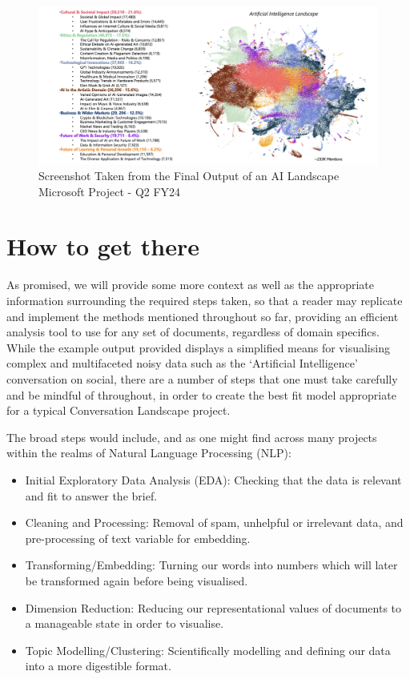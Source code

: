 \documentclass[
  letterpaper,
  DIV=11,
  numbers=noendperiod]{scrreprt}
\begin{document}
\begin{figure}[H]

{\centering \includegraphics{img/ai_landscape_output_example.png}

}

\caption{Screenshot Taken from the Final Output of an AI Landscape
Microsoft Project - Q2 FY24}

\end{figure}%

\section{How to get there}\label{how-to-get-there}

As promised, we will provide some more context as well as the
appropriate information surrounding the required steps taken, so that a
reader may replicate and implement the methods mentioned throughout so
far, providing an efficient analysis tool to use for any set of
documents, regardless of domain specifics. While the example output
provided displays a simplified means for visualising complex and
multifaceted noisy data such as the `Artificial Intelligence'
conversation on social, there are a number of steps that one must take
carefully and be mindful of throughout, in order to create the best fit
model appropriate for a typical Conversation Landscape project.

The broad steps would include, and as one might find across many
projects within the realms of Natural Language Processing (NLP):

\begin{itemize}
\item
  Initial Exploratory Data Analysis (EDA): Checking that the data is
  relevant and fit to answer the brief.
\item
  Cleaning and Processing: Removal of spam, unhelpful or irrelevant
  data, and pre-processing of text variable for embedding.
\item
  Transforming/Embedding: Turning our words into numbers which will
  later be transformed again before being visualised.
\item
  Dimension Reduction: Reducing our representational values of documents
  to a manageable state in order to visualise.
\item
  Topic Modelling/Clustering: Scientifically modelling and defining our
  data into a more digestible format.
\end{itemize}
\end{document}
